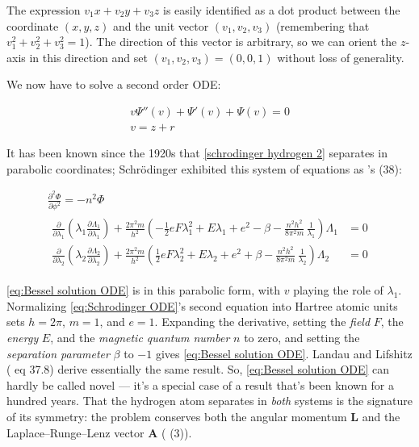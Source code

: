\documentclass{article}
\theoremstyle{definition}
\theoremstyle{plain}
\begin{document}
The expression $v_1 x + v_2 y + v_3 z$ is easily identified as a dot product between
the coordinate $(x,y,z)$ and the unit vector $(v_1, v_2, v_3)$ (remembering
that $v_1^2 + v_2^2 + v_3^2 = 1$).  The direction of this vector is arbitrary,
so we can orient the $z$-axis in this direction and set $(v_1, v_2, v_3) = (0,0,1)$
without loss of generality.

We now have to solve a second order ODE:

\begin{equation}
\label{eq:Bessel solution ODE}
\begin{gathered}
v \Psi''(v) + \Psi'(v) + \Psi(v) = 0 \\
v=z+r
\end{gathered}
\end{equation}

It has been known since the 1920s that \eqref{schrodinger hydrogen 2} separates
in parabolic coordinates; Schr\"odinger exhibited this system of equations as \cite{Schrodinger26}'s (38):

{\small
  \begin{equation}
\label{eq:Schrodinger ODE}
  \begin{gathered}
  \frac{\partial^{2}\Phi}{\partial\phi^{2}} = -n^{2}\Phi \\[2ex]
  \begin{aligned}
  \frac{\partial}{\partial\lambda_{1}}\!\left(\lambda_{1}\frac{\partial\Lambda_{1}}{\partial\lambda_{1}}\right)
   + \frac{2\pi^{2}m}{h^{2}}\left(-\tfrac{1}{2}eF\lambda_{1}^{2} + E\lambda_{1} + e^{2} - \beta
     - \frac{n^{2}h^{2}}{8\pi^{2}m}\,\frac{1}{\lambda_{1}}\right)\Lambda_{1} &= 0 \\[1ex]
  \frac{\partial}{\partial\lambda_{2}}\!\left(\lambda_{2}\frac{\partial\Lambda_{2}}{\partial\lambda_{2}}\right)
   + \frac{2\pi^{2}m}{h^{2}}\left(\tfrac{1}{2}eF\lambda_{2}^{2} + E\lambda_{2} + e^{2} + \beta
     - \frac{n^{2}h^{2}}{8\pi^{2}m}\,\frac{1}{\lambda_{2}}\right)\Lambda_{2} &= 0
  \end{aligned}
  \end{gathered}
  \end{equation}
}

\eqref{eq:Bessel solution ODE} is in this parabolic form, with $v$ playing the role of $\lambda_1$.
Normalizing \eqref{eq:Schrodinger ODE}'s second equation
into Hartree atomic units sets $h=2\pi$, $m=1$, and $e=1$.
Expanding the derivative,
setting the {\it field} $F$, the {\it energy} $E$, and the {\it magnetic quantum number} $n$ to zero, and
setting the {\it separation parameter} $\beta$ to $-1$
gives \eqref{eq:Bessel solution ODE}.
Landau and Lifshitz (\cite{LandauLifshitz} eq 37.8) derive essentially the same result.
So, \eqref{eq:Bessel solution ODE} can hardly be called novel --- it's a special
case of a result that's been known for a hundred years.
That the hydrogen atom separates in {\it both} systems is the signature
of its symmetry: the problem conserves both the angular momentum $\mathbf{L}$
and the Laplace--Runge--Lenz vector $\mathbf{A}$
(\cite{BanderItzykson} (3)).
\end{document}

